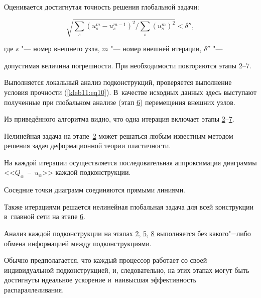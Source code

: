 \begin{description}[{\sc Этап 0.}]
\item[\hypertarget{et:7}{\sc Этап 7.}] Оценивается достигнутая точность решения глобальной задачи:

\begin{equation*}


\sqrt{{\sum_s \left( u_s^m -u_s^{m-1} \right)^2 }\Big/{\sum_s \left( u_s^m \right)^2}

}<\delta'',

\end{equation*}

где $s$ "--- номер внешнего узла, $m$ "--- номер внешней итерации, $\delta''$ "---

допустимая величина погрешности. При необходимости повторяются этапы 2--7.





\item[\hypertarget{et:8}{\sc Этап 8.}] Выполняется локальный анализ подконструкций, проверяется выполнение условия прочности (\ref{kleb11:eq10}). В~качестве исходных данных здесь выступают полученные при глобальном анализе (этап \hyperlink{et:6}{6}) перемещения внешних узлов.

\end{description}



Из приведённого алгоритма видно, что одна итерация включает этапы \hyperlink{et:2}{2}--\hyperlink{et:7}{7}.

Нелинейная задача на этапе~\hyperlink{et:2}{2} может решаться любым известным методом решения задач деформационной теории пластичности. 

На каждой итерации осуществляется последовательная аппроксимация диаграммы \mbox{<<$Q_\alpha$ -- $u_\alpha$>>} каждой подконструкции. 

Соседние точки диаграмм соединяются прямыми линиями. 

Также итерациями решается нелинейная глобальная задача для всей конструкции в~главной сети на этапе \hyperlink{et:6}{6}. 

Анализ каждой подконструкции на этапах  \hyperlink{et:2}{2},  \hyperlink{et:5}{5}, \hyperlink{et:8}{8} выполняется без какого"=либо обмена информацией между подконструкциями. 

Обычно предполагается, что каждый процессор работает со своей индивидуальной подконструкцией, и, следовательно, на этих этапах могут быть достигнуты идеальное ускорение и~наивысшая эффективность распараллеливания.



